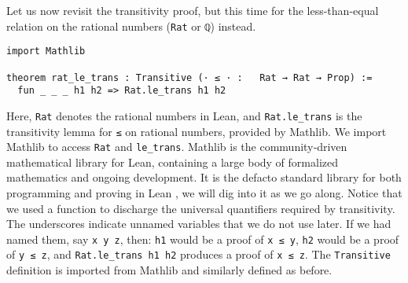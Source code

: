Let us now revisit the transitivity proof, but this time for the less-than-equal relation on 
the rational numbers (\lstinline[language=lean]|Rat| or \lstinline[language=lean]|ℚ|) instead.
\begin{lstlisting}[language=lean]
import Mathlib

theorem rat_le_trans : Transitive (· ≤ · :   Rat → Rat → Prop) :=
  fun _ _ _ h1 h2 => Rat.le_trans h1 h2
\end{lstlisting}
Here, \lstinline[language=lean]|Rat| denotes the rational numbers in Lean, 
and \lstinline[language=lean]|Rat.le_trans| is the transitivity lemma 
for \lstinline[language=lean]|≤| on rational numbers, provided by Mathlib.
We import Mathlib to access \lstinline[language=lean]|Rat| 
and \lstinline[language=lean]|le_trans|. 
Mathlib is the community‑driven mathematical 
library for Lean, containing a large body of formalized mathematics 
and ongoing development.
It is the defacto standard library for both programming and proving
in Lean \cite{mathlib2020}, we will dig into it as we go along.
Notice that we used a function to discharge the universal 
quantifiers required by transitivity. The underscores indicate 
unnamed variables that we do not use later. If we had named 
them, say \lstinline|x y z|, then:
\lstinline[language=lean]|h1| would be a proof of \lstinline[language=lean]|x ≤ y|,
\lstinline[language=lean]|h2| would be a proof of \lstinline[language=lean]|y ≤ z|,
and \lstinline[language=lean]|Rat.le_trans h1 h2| produces a proof of \lstinline[language=lean]|x ≤ z|.
The \lstinline[language=lean]|Transitive| definition is imported from Mathlib and similarly 
defined as before. 
